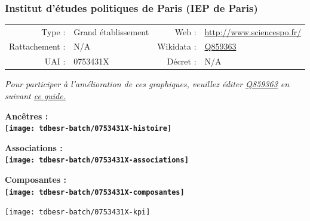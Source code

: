 \documentclass[12pt,french,]{article}
\begin{document}
\ifoddpage ~\newpage \fi   

\hypertarget{institut-duxe9tudes-politiques-de-paris-iep-de-paris}{%
\subsubsection{Institut d'études politiques de Paris (IEP de
Paris)}\label{institut-duxe9tudes-politiques-de-paris-iep-de-paris}}

\begin{tabular*}{\textwidth}{rp{5cm}rl}  
\hline  
Type : & Grand établissement & Web : &\href{http://www.sciencespo.fr/}{http://www.sciencespo.fr/} \\  
Rattachement : & N/A & Wikidata : & \href{https://www.wikidata.org/entity/Q859363}{Q859363} \\  
UAI : & 0753431X & Décret : & N/A \\  
\hline  
\end{tabular*}

\textit{\scriptsize Pour participer à l'amélioration de ces graphiques, veuillez éditer  \href{https://www.wikidata.org/entity/Q859363}{Q859363}  en suivant \href{https://github.com/cpesr/wikidataESR/blob/master/Rmd/wikidataESR.md}{ce guide.}}

\vspace{1cm}  
\begin{minipage}[b]{0.50\textwidth}\begin{center} \bf Ancêtres : \\  
\texttt{[image: tdbesr-batch/0753431X-histoire]} \end{center}\end{minipage}\begin{minipage}[b]{0.50\textwidth}\begin{center} \bf Associations : \\  
\texttt{[image: tdbesr-batch/0753431X-associations]} \end{center}\end{minipage}

\hrulefill

\begin{center} \bf Composantes : \\  
\texttt{[image: tdbesr-batch/0753431X-composantes]} \end{center}

\begin{center}\texttt{[image: tdbesr-batch/0753431X-kpi]} \end{center}\checkoddpage
\end{document}
